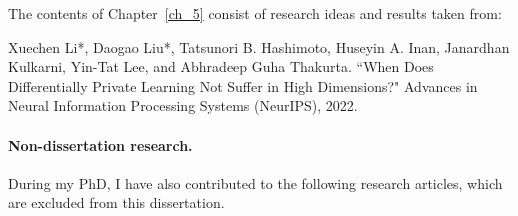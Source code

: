 \noindent The contents of Chapter~\ref{ch_5} consist of research ideas and results taken from:

\begin{mdframed}[leftline=true, topline=false, rightline=false, bottomline=false, linewidth=2pt]
Xuechen Li*, Daogao Liu*, Tatsunori B. Hashimoto, Huseyin A. Inan, Janardhan Kulkarni, Yin-Tat Lee, and Abhradeep Guha Thakurta. ``When Does Differentially Private Learning Not Suffer in High Dimensions?" Advances in Neural Information Processing Systems (NeurIPS), 2022.~\citep{li2022does}
\end{mdframed}


\newpage
\paragraph{Non-dissertation research.}
During my PhD, I have also contributed to the following research articles, which are excluded from this dissertation.


